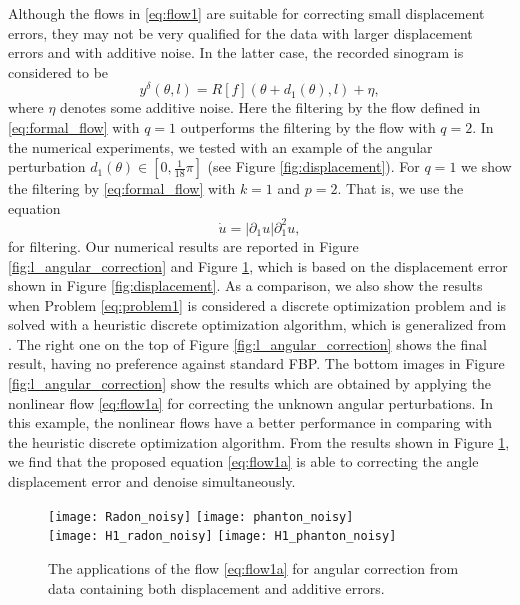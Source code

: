 \documentclass[runningheads,a4paper]{llncs}\usepackage{latexsym}
\newcommand{\abs}[1]{\left| #1 \right|}
\begin{document}
Although the flows in \eqref{eq:flow1} are suitable for correcting small displacement errors,
they may not be very qualified for the data with larger displacement errors and with additive noise.
In the latter case, the recorded sinogram is considered to be
\begin{equation}\label{eq:angle_dis_noise}
y^{\delta}(\theta,l)=R[f](\theta+d_1(\theta),l)+\eta,
\end{equation}
where $\eta$ denotes some additive noise.
Here the filtering by the flow defined in \eqref{eq:formal_flow} with $q=1$ 
outperforms the filtering by the flow with $q=2$.
In the numerical experiments, we tested with an example of the angular perturbation $d_1(\theta)\in [0,\frac{1}{18}\pi]$ 
(see Figure \ref{fig:displacement}). For $q=1$ we show the filtering by \eqref{eq:formal_flow} with $k=1$ and $p=2$.
That is, we use the equation
\begin{equation} \label{eq:flow1a}
 \dot{u} = \abs{\partial_1 u} \partial_1^2 u,
\end{equation}
for filtering. 
Our numerical results are reported in Figure \ref{fig:l_angular_correction} and Figure \ref{fig:l_noisy_angular_correction},
which is based on the displacement error shown in Figure \ref{fig:displacement}. 
As a comparison, we also show the results when Problem \eqref{eq:problem1} is considered a discrete optimization problem and 
is solved with a heuristic discrete optimization algorithm, which is generalized from \cite{Nik09}. The right one on the top of Figure \ref{fig:l_angular_correction} 
shows the final result, having no preference against standard FBP.
The bottom images in Figure \ref{fig:l_angular_correction} show the results which are obtained by applying the nonlinear flow \eqref{eq:flow1a} 
for correcting the unknown angular perturbations.
In this example, the nonlinear flows have a better performance in comparing with the heuristic discrete optimization algorithm.
From the results shown in Figure \ref{fig:l_noisy_angular_correction}, 
we find that the proposed equation \eqref{eq:flow1a} is able to correcting the angle displacement error and denoise simultaneously. 
\begin{figure}
\texttt{[image: Radon\_noisy]}   \texttt{[image: phanton\_noisy]} \\
\texttt{[image: H1\_radon\_noisy]} \texttt{[image: H1\_phanton\_noisy]} 
\caption{The applications of the flow \eqref{eq:flow1a} for angular correction from data containing both displacement and additive errors.}
\label{fig:l_noisy_angular_correction}
\end{figure}
\end{document}
